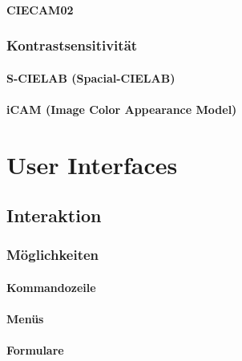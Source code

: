 \documentclass[a4paper, 11pt, accentcolor = tud3b]{tudreport}
\begin{document}
				\subsubsection{CIECAM02} %

			\subsection{Kontrastsensitivität} %

				\subsubsection{S-CIELAB (Spacial-CIELAB)} %

				\subsubsection{iCAM (Image Color Appearance Model)} %

	\chapter{User Interfaces} %

		\section{Interaktion} %

			\subsection{Möglichkeiten} %

				\subsubsection{Kommandozeile} %

				\subsubsection{Menüs} %

				\subsubsection{Formulare} %
\end{document}
